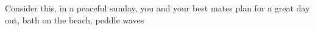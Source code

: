 Consider this, in a peaceful sunday, you and your best mates plan for a great day out, bath on the beach, peddle waves 